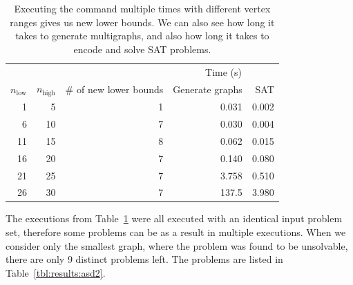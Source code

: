 \begin{table}[H]
    \centering
    \begin{tabular}{rrrrr}
        \toprule
        &&& \multicolumn{2}{c}{Time (s)} \\
        \cmidrule{4-5}
        $n_\text{low}$ & $n_\text{high}$ & \# of new lower bounds & Generate graphs & SAT\\
        \midrule
        1  & 5  & 1 & 0.031 & 0.002\\
        6  & 10 & 7 & 0.030 & 0.004\\
        11 & 15 & 8 & 0.062 & 0.015\\
        16 & 20 & 7 & 0.140 & 0.080\\
        21 & 25 & 7 & 3.758 & 0.510\\
        26 & 30 & 7 & 137.5\phantom{00} & 3.980\\
        \bottomrule
    \end{tabular}
    \caption{%
    Executing the command multiple times with different vertex ranges gives us new lower bounds.
    We can also see how long it takes to generate multigraphs, and also how long it takes to encode and solve SAT problems.
    }
    \label{tbl:results:asd1}
\end{table}

The executions from Table~\ref{tbl:results:asd1} were all executed with an identical input problem set, therefore some problems can be as a result in multiple executions.
When we consider only the smallest graph, where the problem was found to be unsolvable, there are only 9 distinct problems left.
The problems are listed in Table~\ref{tbl:results:asd2}.

